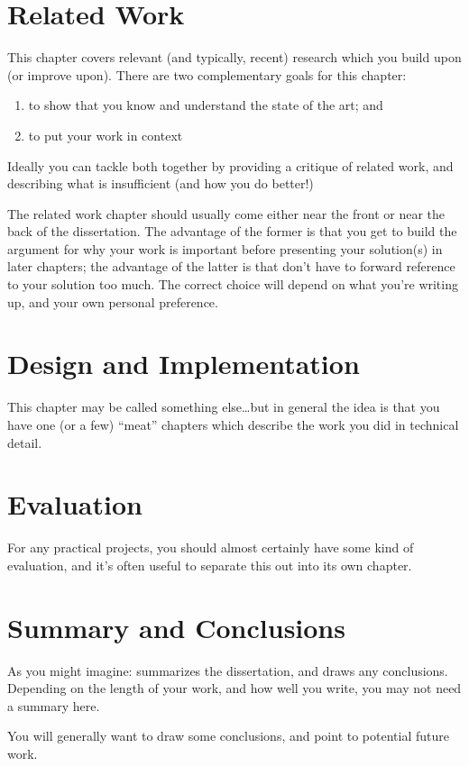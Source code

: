 \documentclass[a4paper,12pt,twoside,openright]{report}
\begin{document}
\chapter{Related Work} 

This chapter covers relevant (and typically, recent) research 
which you build upon (or improve upon). There are two complementary 
goals for this chapter: 
\begin{enumerate} 
  \item to show that you know and understand the state of the art; and 
  \item to put your work in context
\end{enumerate} 

Ideally you can tackle both together by providing a critique of
related work, and describing what is insufficient (and how you do
better!)

The related work chapter should usually come either near the front or
near the back of the dissertation. The advantage of the former is that
you get to build the argument for why your work is important before
presenting your solution(s) in later chapters; the advantage of the
latter is that don't have to forward reference to your solution too
much. The correct choice will depend on what you're writing up, and
your own personal preference.



\chapter{Design and Implementation} 

This chapter may be called something else\ldots but in general 
the idea is that you have one (or a few) ``meat'' chapters which
describe the work you did in technical detail. 


\chapter{Evaluation} 

For any practical projects, you should almost certainly have
some kind of evaluation, and it's often useful to separate 
this out into its own chapter. 


\chapter{Summary and Conclusions} 

As you might imagine: summarizes the dissertation, and draws 
any conclusions. Depending on the length of your work, and 
how well you write, you may not need a summary here. 

You will generally want to draw some conclusions, and point
to potential future work. 




\appendix
\singlespacing

 
 
\end{document}
